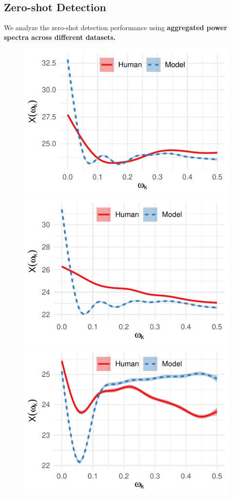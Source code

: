 \documentclass[lettersize,journal]{IEEEtran}
\begin{document}
\subsection{Zero-shot Detection}
We analyze the zero-shot detection performance using \textbf{aggregated power spectra across different datasets.}
\begin{figure}[H]
    \centering

    \includegraphics[width=0.3\linewidth]{images/en_essay_aggregated.pdf}
    \includegraphics[width=0.3\linewidth]{images/en_reuter_aggregated.pdf}
    \includegraphics[width=0.3\linewidth]{images/eng_wp_aggregated.pdf}

    \par\smallskip

    \par\vspace{0.6em}


\end{figure}
\end{document}
